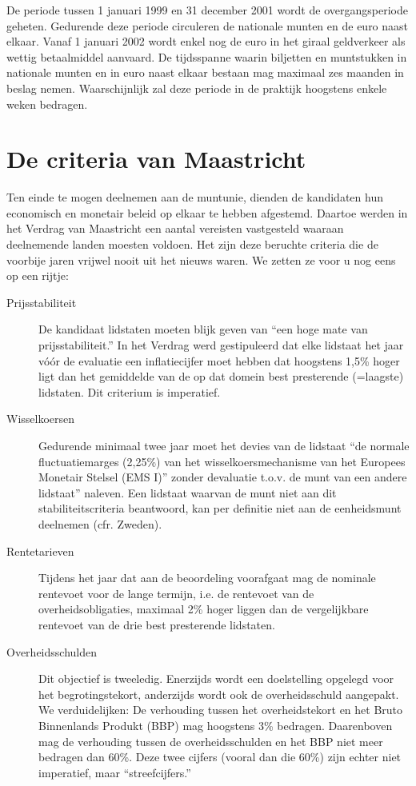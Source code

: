 De periode tussen 1 januari 1999 en 31 december 2001 wordt de
overgangsperiode geheten. Gedurende deze periode circuleren de
nationale munten en de euro naast elkaar. Vanaf 1 januari 2002 wordt
enkel nog de euro in het giraal geldverkeer als wettig betaalmiddel
aanvaard. De tijdsspanne waarin biljetten en muntstukken in
nationale munten en in euro naast elkaar bestaan mag maximaal zes
maanden in beslag nemen. Waarschijnlijk zal deze periode in de
praktijk hoogstens enkele weken bedragen.


\section{De criteria van Maastricht}

Ten einde te mogen deelnemen aan de muntunie, dienden de kandidaten
hun economisch en monetair beleid op elkaar te hebben afgestemd.
Daartoe werden in het Verdrag van Maastricht een aantal vereisten
vastgesteld waaraan deelnemende landen moesten voldoen. Het zijn
deze beruchte criteria die de voorbije jaren vrijwel nooit uit het
nieuws waren. We zetten ze voor u nog eens op een rijtje:

\begin{description}
\item[Prijsstabiliteit] De kandidaat lidstaten moeten blijk geven van
``een hoge mate van prijsstabiliteit.'' In het Verdrag werd
gestipuleerd dat elke lidstaat het jaar v\'o\'or de evaluatie een
inflatiecijfer moet hebben dat hoogstens 1,5\% hoger ligt dan het
gemiddelde van de op dat domein best presterende (=laagste)
lidstaten. Dit criterium is imperatief.

\item[Wisselkoersen] Gedurende minimaal twee jaar moet het devies van de
lidstaat ``de normale fluctuatiemarges (2,25\%) van het
wisselkoersmechanisme van het Europees Monetair Stelsel (EMS I)''
zonder devaluatie t.o.v. de munt van een andere lidstaat'' naleven.
Een lidstaat waarvan de munt niet aan dit stabiliteitscriteria
beantwoord, kan per definitie niet aan de eenheidsmunt deelnemen
(cfr. Zweden).

\item[Rentetarieven] Tijdens het jaar dat aan de beoordeling voorafgaat
mag de nominale rentevoet voor de lange termijn, i.e. de rentevoet
van de overheidsobligaties, maximaal 2\% hoger liggen dan de
vergelijkbare rentevoet van de drie best presterende lidstaten.

\item[Overheidsschulden] Dit objectief is tweeledig. Enerzijds wordt een
doelstelling opgelegd voor het begrotingstekort, anderzijds wordt
ook de overheidsschuld aangepakt. We verduidelijken: De verhouding
tussen het overheidstekort en het Bruto Binnenlands Produkt (BBP)
mag hoogstens 3\% bedragen. Daarenboven mag de verhouding tussen de
overheidsschulden en het BBP niet meer bedragen dan 60\%. Deze twee
cijfers (vooral dan die 60\%) zijn echter niet imperatief, maar
``streefcijfers.''
\end{description}

